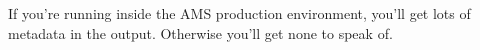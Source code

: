 \documentclass{bproc-l}
\begin{document}

\maketitle

If you're running inside the AMS production environment, you'll get
lots of metadata in the output.  Otherwise you'll get none to speak
of.
\end{document}
